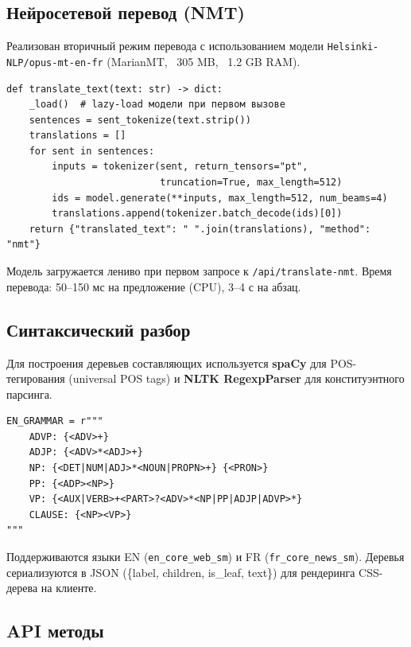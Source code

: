 \subsection{Нейросетевой перевод (NMT)}

Реализован вторичный режим перевода с использованием модели
\texttt{Helsinki-NLP/opus-mt-en-fr} (MarianMT, ~305 MB, ~1.2 GB RAM).

\begin{lstlisting}[caption={NMT перевод.},label={lst:nmt}]
def translate_text(text: str) -> dict:
    _load()  # lazy-load модели при первом вызове
    sentences = sent_tokenize(text.strip())
    translations = []
    for sent in sentences:
        inputs = tokenizer(sent, return_tensors="pt",
                           truncation=True, max_length=512)
        ids = model.generate(**inputs, max_length=512, num_beams=4)
        translations.append(tokenizer.batch_decode(ids)[0])
    return {"translated_text": " ".join(translations), "method": "nmt"}
\end{lstlisting}

Модель загружается лениво при первом запросе к \texttt{/api/translate-nmt}.
Время перевода: 50--150 мс на предложение (CPU), 3--4 с на абзац.

\subsection{Синтаксический разбор}

Для построения деревьев составляющих используется \textbf{spaCy}
для POS-тегирования (universal POS tags) и \textbf{NLTK RegexpParser}
для конституэнтного парсинга.

\begin{lstlisting}[caption={Грамматика для EN (universal POS).},label={lst:en_grammar}]
EN_GRAMMAR = r"""
    ADVP: {<ADV>+}
    ADJP: {<ADV>*<ADJ>+}
    NP: {<DET|NUM|ADJ>*<NOUN|PROPN>+} {<PRON>}
    PP: {<ADP><NP>}
    VP: {<AUX|VERB>+<PART>?<ADV>*<NP|PP|ADJP|ADVP>*}
    CLAUSE: {<NP><VP>}
"""
\end{lstlisting}

Поддерживаются языки EN (\texttt{en\_core\_web\_sm}) и FR
(\texttt{fr\_core\_news\_sm}). Деревья сериализуются в JSON
(\{label, children, is\_leaf, text\}) для рендеринга CSS-дерева
на клиенте.

\subsection{API методы}

